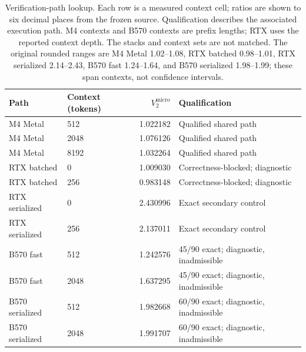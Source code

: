 \begin{table}[t]
\caption{Verification-path lookup. Each row is a measured context cell; ratios are shown to six decimal places from the frozen source. Qualification describes the associated execution path. M4 contexts and B570 contexts are prefix lengths; RTX uses the reported context depth. The stacks and context sets are not matched. The original rounded ranges are M4 Metal 1.02--1.08, RTX batched 0.98--1.01, RTX serialized 2.14--2.43, B570 fast 1.24--1.64, and B570 serialized 1.98--1.99; these span contexts, not confidence intervals.}
\label{tab:verificationlookup}
\centering
\begin{tabular}{llrl}
\toprule
Path & Context (tokens) & $V_2^{\mathrm{micro}}$ & Qualification \\
\midrule
M4 Metal & 512 & 1.022182 & Qualified shared path \\
M4 Metal & 2048 & 1.076126 & Qualified shared path \\
M4 Metal & 8192 & 1.032264 & Qualified shared path \\
RTX batched & 0 & 1.009030 & Correctness-blocked; diagnostic \\
RTX batched & 256 & 0.983148 & Correctness-blocked; diagnostic \\
RTX serialized & 0 & 2.430996 & Exact secondary control \\
RTX serialized & 256 & 2.137011 & Exact secondary control \\
B570 fast & 512 & 1.242576 & 45/90 exact; diagnostic, inadmissible \\
B570 fast & 2048 & 1.637295 & 45/90 exact; diagnostic, inadmissible \\
B570 serialized & 512 & 1.982668 & 60/90 exact; diagnostic, inadmissible \\
B570 serialized & 2048 & 1.991707 & 60/90 exact; diagnostic, inadmissible \\
\bottomrule
\end{tabular}
\end{table}
